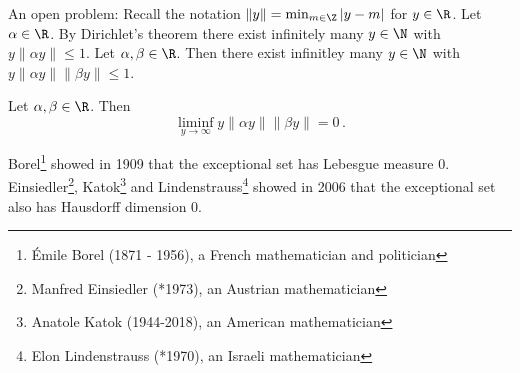 An open problem: Recall the notation \( \|y\| = \min_{m \in \Z} |y-m| \) for \( y \in \R \).
Let \( \alpha \in \R \).
By Dirichlet's theorem there exist infinitely many \( y \in \N \) with \( y \|\alpha y \| \leq 1 \).
Let \( \alpha, \beta \in \R \).
Then there exist infinitley many \( y \in \N \) with \( y \|\alpha y\| \|\beta y\| \leq 1 \).

\begin{conj*}
	Let \( \alpha,\beta \in \R \).
	Then
	\[ \liminf_{y \to \infty} y \|\alpha y\| \|\beta y\| = 0 \,. \]
\end{conj*}

Borel\footnote{Émile Borel (1871 - 1956), a French mathematician and politician} showed in 1909 that the exceptional set has Lebesgue measure 0.
Einsiedler\footnote{Manfred Einsiedler (*1973), an Austrian mathematician}, Katok\footnote{Anatole Katok (1944-2018), an American mathematician} and Lindenstrauss\footnote{Elon Lindenstrauss (*1970), an Israeli mathematician} showed in 2006 that the exceptional set also has Hausdorff dimension 0.